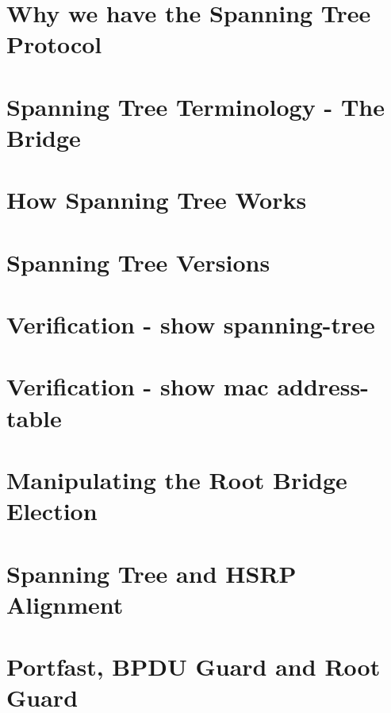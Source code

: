 \documentclass[pdflatex,compress,mathserif]{beamer}
\begin{document}
\section{Why we have the Spanning Tree Protocol}

\section{Spanning Tree Terminology - The Bridge}

\section{How Spanning Tree Works}

\section{Spanning Tree Versions}

\section{Verification - show spanning-tree}

\section{Verification - show mac address-table}

\section{Manipulating the Root Bridge Election}

\section{Spanning Tree and HSRP Alignment}

\section{Portfast, BPDU Guard and Root Guard}
\end{document}
